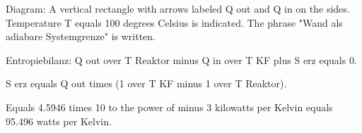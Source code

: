Diagram: A vertical rectangle with arrows labeled Q out and Q in on the sides. Temperature T equals 100 degrees Celsius is indicated. The phrase "Wand als adiabare Systemgrenze" is written.

Entropiebilanz:
Q out over T Reaktor minus Q in over T KF plus S erz equals 0.

S erz equals Q out times (1 over T KF minus 1 over T Reaktor).

Equals 4.5946 times 10 to the power of minus 3 kilowatts per Kelvin equals 95.496 watts per Kelvin.